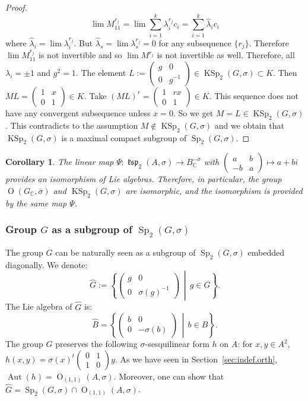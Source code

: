 \documentclass[a4paper,oneside,11pt]{amsart}
\DeclareMathOperator{\Aut}{Aut}
\DeclareMathOperator{\Sp}{Sp}
\DeclareMathOperator{\OO}{O}
\DeclareMathOperator{\ksp}{\mathfrak{ksp}}
\DeclareMathOperator{\KSp}{KSp}
\newcommand{\midwd}{\,\middle\vert\,}
\theoremstyle{plain}
\newtheorem{cor}[teo]{Corollary}
\theoremstyle{definition}
\theoremstyle{remark}
\begin{document}
\begin{proof}
$$\lim M^{r_j}_{11}=\lim\sum_{i=1}^k\lambda_i^{r_j}c_i=\sum_{i=1}^k\hat\lambda_ic_i$$
where $\hat\lambda_i=\lim\lambda_i^{r_j}$. But $\hat\lambda_s=\lim\lambda_s^{r_j}=0$ for any subsequence $\{r_j\}$. Therefore $\lim M^{r_j}_{11}$ is not invertible and so $\lim M^{r_j}$ is not invertible as well. Therefore, all $\lambda_i=\pm 1$ and $g^2=1$. The element $L:=\begin{pmatrix}
g & 0\\
0 & g^{-1}
\end{pmatrix}\in\KSp_2(G,\sigma)\subset K$. Then $ML=\begin{pmatrix}
1 & x \\
0 & 1
\end{pmatrix}\in K$. Take $(ML)^r=\begin{pmatrix}
1 & rx \\
0 & 1
\end{pmatrix}\in K$. This sequence does not have any convergent subsequence unless $x=0$. So we get $M=L\in\KSp_2(G,\sigma)$. This contradicts to the assumption $M\notin\KSp_2(G,\sigma)$ and we obtain that $\KSp_2(G,\sigma)$ is a maximal compact subgroup of $\Sp_2(G,\sigma)$.
\end{proof}

\begin{cor}
    The linear map $\Psi\colon \ksp_2(A,\sigma)\to B_\mathbb C^{-\bar\sigma}$ with $\begin{pmatrix}
        a & b \\
        -b & a
    \end{pmatrix}\mapsto a+bi$ provides an isomorphism of Lie algebras. Therefore, in particular, the group $\OO(G_\mathbb C,\bar\sigma)$ and $\KSp_2(G,\sigma)$ are isomorphic, and the isomorphism is provided by the same map $\Psi$.
\end{cor}


\subsubsection{Group $G$ as a subgroup of $\Sp_2(G,\sigma)$}\label{sec:hat_G}

The group $G$ can be naturally seen as a subgroup of $\Sp_2(G,\sigma)$ embedded diagonally. We denote: 
$$\hat G:=\left\{\begin{pmatrix}
    g & 0 \\
    0 & \sigma(g)^{-1}
\end{pmatrix}\midwd g\in G\right\}.$$
The Lie algebra of $\hat G$ is:
$$\hat B=\left\{\begin{pmatrix}
    b & 0 \\
    0 & -\sigma(b)
\end{pmatrix}\midwd b\in B\right\}.$$
The group $\hat G$ preserves the following $\sigma$-sesquilinear form $h$ on $A$: for $x,y\in A^2$, $h(x,y)=\sigma(x)^t\begin{pmatrix}
    0 & 1 \\
    1 & 0
\end{pmatrix}y$. As we have seen in Section~\ref{sec:indef.orth}, $\Aut(h)=\OO_{(1,1)}(A,\sigma)$. Moreover, one can show that $\hat G=\Sp_{2}(G,\sigma)\cap\OO_{(1,1)}(A,\sigma)$.
\end{document}
